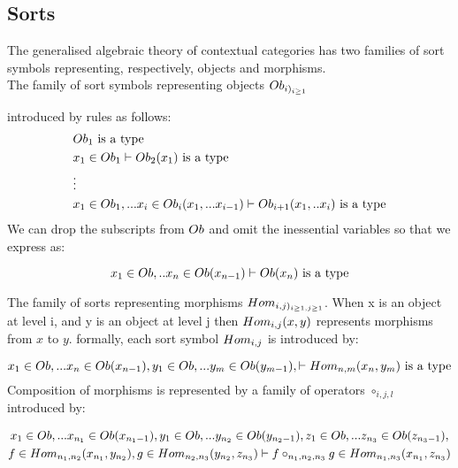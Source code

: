 \documentclass[10pt,a4paper]{article}
\begin{document}
\subsection*{Sorts}
The generalised algebraic theory of contextual categories has two families of sort symbols representing, respectively,  objects and morphisms. \\

\noindent The family of sort symbols representing 
objects $Ob_{i)_{i\geq 1}}$ 


introduced by 
rules as follows: 
\begin{align*}
&Ob_1\mbox{ is a type} \\
&x_1 \in Ob_1 \vdash Ob_2(x_1)\mbox{ is a type} \\
& \vdots \\
&x_1 \in Ob_1,... x_{i} \in Ob_{i}(x_1,...x_{i-1}) \vdash Ob_{i+1}(x_1, ..x_{i})\mbox{ is a type} \\
\end{align*}
\noindent We can drop the subscripts from $Ob$ and omit the inessential variables so that we express as:

\begin{equation}
x_1 \in Ob,.. x_{n} \in Ob(x_{n-1}) \vdash Ob(x_{n})\mbox{ is a type} \\
\end{equation}
\vspace{0cm}

\noindent The family of sorts representing morphisms
$Hom_{i,j)_{i\geq 1,j\geq1}}$. 
When x is an object at level i, and y is an object at level j then $Hom_{i,j}(x,y)$ represents morphisms from $x$ to $y$. 
formally, each sort symbol $Hom_{i,j}$ is introduced by:

\begin{equation}
\label{Homintroduction}
x_1 \in Ob,... x_{n} \in Ob(x_{n-1}), y_1 \in Ob,... y_{m} \in Ob(y_{m-1}),
\vdash Hom_{n,m}(x_n,y_m)\mbox{ is a type}
 \\
\end{equation}
\noindent Composition of morphisms is represented by a family of operators $\circ_{i,j,l}$ introduced by:

\begin{multline}
\label{compositionintro}
x_1 \in Ob,... x_{{n_1}} \in Ob(x_{{n_1}-1}), y_1 \in Ob,... y_{{n_2}} \in Ob(y_{{n_2}-1}),z_1 \in Ob,... z_{{n_3}} \in Ob(z_{{n_3}-1}), \\
f \in Hom_{{n_1},{n_2}}(x_{n_1},y_{n_2}), g \in Hom_{{n_2},{n_3}}(y_{n_2},z_{n_3})
\vdash f \circ_{{n_1},{n_2},{n_3}} g \in Hom_{{n_1},{n_3}}(x_{n_1},z_{n_3})
\end{multline}
\end{document}
